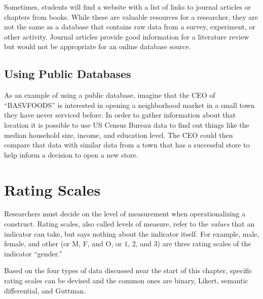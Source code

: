 Sometimes, students will find a website with a list of links to journal articles or chapters from books. While these are valuable resources for a researcher, they are not the same as a database that contains raw data from a survey, experiment, or other activity. Journal articles provide good information for a literature review but would not be appropriate for an online database source.

\subsection{Using Public Databases}

As an example of using a public database, imagine that the CEO of ``BASVFOODS'' is interested in opening a neighborhood market in a small town they have never serviced before. In order to gather information about that location it is possible to use US Census Bureau data to find out things like the median household size, income, and education level. The CEO could then compare that data with similar data from a town that has a successful store to help inform a decision to open a new store.

\section{Rating Scales}

Researchers must decide on the level of measurement when operationalizing a construct. Rating scales, also called levels of measure, refer to the \textit{values} that an indicator can take, but says nothing about the indicator itself. For example, male, female, and other (or M, F, and O, or $ 1 $, $ 2 $, and $ 3 $) are three rating scales of the indicator ``gender.'' 

Based on the four types of data discussed near the start of this chapter, specific rating scales can be devised and the common ones are binary, Likert, semantic differential, and Guttman. 

